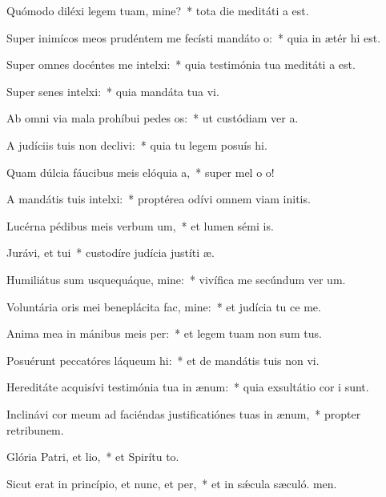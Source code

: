 \item Quómodo diléxi legem tuam, mine?~* tota die meditáti a est.
\item Super inimícos meos prudéntem me fecísti mandáto o:~* quia in ætér hi est.
\item Super omnes docéntes me intelxi:~* quia testimónia tua meditáti a est.
\item Super senes intelxi:~* quia mandáta tua vi.
\item Ab omni via mala prohíbui pedes os:~* ut custódiam ver a.
\item A judíciis tuis non declivi:~* quia tu legem posuís hi.
\item Quam dúlcia fáucibus meis elóquia a,~* super mel o o!
\item A mandátis tuis intelxi:~* proptérea odívi omnem viam initis.
\item Lucérna pédibus meis verbum um,~* et lumen sémi is.
\item Jurávi, et tui~* custodíre judícia justíti æ.
\item Humiliátus sum usquequáque, mine:~* vivífica me secúndum ver um.
\item Voluntária oris mei beneplácita fac, mine:~* et judícia tu ce me.
\item Anima mea in mánibus meis per:~* et legem tuam non sum tus.
\item Posuérunt peccatóres láqueum hi:~* et de mandátis tuis non vi.
\item Hereditáte acquisívi testimónia tua in ænum:~* quia exsultátio cor i sunt.
\item Inclinávi cor meum ad faciéndas justificatiónes tuas in ænum,~* propter retribunem.
\item Glória Patri, et lio,~* et Spirítu to.
\item Sicut erat in princípio, et nunc, et per,~* et in sǽcula sæculó. men.
